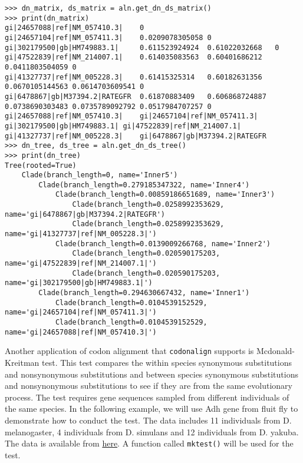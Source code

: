 \begin{verbatim}
>>> dn_matrix, ds_matrix = aln.get_dn_ds_matrix()
>>> print(dn_matrix)
gi|24657088|ref|NM_057410.3|    0
gi|24657104|ref|NM_057411.3|    0.0209078305058 0
gi|302179500|gb|HM749883.1|     0.611523924924  0.61022032668   0
gi|47522839|ref|NM_214007.1|    0.614035083563  0.60401686212   0.0411803504059 0
gi|41327737|ref|NM_005228.3|    0.61415325314   0.60182631356   0.0670105144563 0.0614703609541 0
gi|6478867|gb|M37394.2|RATEGFR  0.61870883409   0.606868724887  0.0738690303483 0.0735789092792 0.0517984707257 0
gi|24657088|ref|NM_057410.3|    gi|24657104|ref|NM_057411.3|    gi|302179500|gb|HM749883.1| gi|47522839|ref|NM_214007.1|    gi|41327737|ref|NM_005228.3|    gi|6478867|gb|M37394.2|RATEGFR
>>> dn_tree, ds_tree = aln.get_dn_ds_tree()
>>> print(dn_tree)
Tree(rooted=True)
    Clade(branch_length=0, name='Inner5')
        Clade(branch_length=0.279185347322, name='Inner4')
            Clade(branch_length=0.00859186651689, name='Inner3')
                Clade(branch_length=0.0258992353629, name='gi|6478867|gb|M37394.2|RATEGFR')
                Clade(branch_length=0.0258992353629, name='gi|41327737|ref|NM_005228.3|')
            Clade(branch_length=0.0139009266768, name='Inner2')
                Clade(branch_length=0.020590175203, name='gi|47522839|ref|NM_214007.1|')
                Clade(branch_length=0.020590175203, name='gi|302179500|gb|HM749883.1|')
        Clade(branch_length=0.294630667432, name='Inner1')
            Clade(branch_length=0.0104539152529, name='gi|24657104|ref|NM_057411.3|')
            Clade(branch_length=0.0104539152529, name='gi|24657088|ref|NM_057410.3|')
\end{verbatim}

Another application of codon alignment that \verb|codonalign| supports
is Mcdonald-Kreitman test. This test compares the within species
synonymous substitutions and nonsynonymous substitutions and between
species synonymous substitutions and nonsynonymous substitutions to see
if they are from the same evolutionary process. The test requires gene
sequences sampled from different individuals of the same species. In the
following example, we will use Adh gene from fluit fly to demonstrate
how to conduct the test. The data includes 11 individuals from
D. melanogaster, 4 individuals from D. simulans and 12 individuals from
D. yakuba. The data is available from
\href{http://zruanweb.com/adh.zip}{here}. A function called
\verb|mktest()| will be used for the test.

